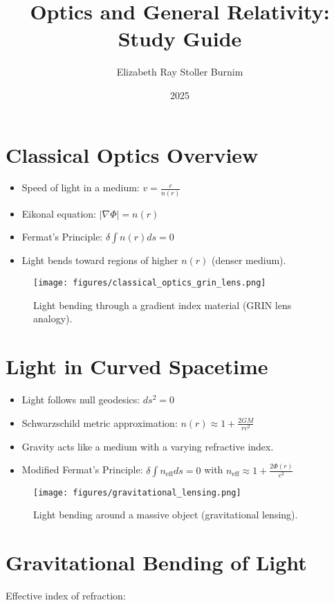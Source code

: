 \documentclass[11pt]{article}
\title{Optics and General Relativity: Study Guide}
\author{Elizabeth Ray Stoller Burnim}
\date{2025}
\begin{document}
\maketitle
\tableofcontents
\newpage

\section{Classical Optics Overview}
\begin{itemize}
    \item Speed of light in a medium: \( v = \frac{c}{n(r)} \)
    \item Eikonal equation: \( |\nabla \Phi| = n(r) \)
    \item Fermat's Principle: \( \delta \int n(r) ds = 0 \)
    \item Light bends toward regions of higher \( n(r) \) (denser medium).
\end{itemize}

\begin{figure}[h]
    \centering
    \texttt{[image: figures/classical\_optics\_grin\_lens.png]}
    \caption{Light bending through a gradient index material (GRIN lens analogy).}
\end{figure}

\newpage
\section{Light in Curved Spacetime}
\begin{itemize}
    \item Light follows null geodesics: \( ds^2 = 0 \)
    \item Schwarzschild metric approximation: \( n(r) \approx 1 + \frac{2GM}{rc^2} \)
    \item Gravity acts like a medium with a varying refractive index.
    \item Modified Fermat's Principle: \( \delta \int n_{\text{eff}} ds = 0 \) with \( n_{\text{eff}} \approx 1 + \frac{2\Phi(r)}{c^2} \)
\end{itemize}

\begin{figure}[h]
    \centering
    \texttt{[image: figures/gravitational\_lensing.png]}
    \caption{Light bending around a massive object (gravitational lensing).}
\end{figure}

\newpage
\section{Gravitational Bending of Light}
Effective index of refraction:
\end{document}
